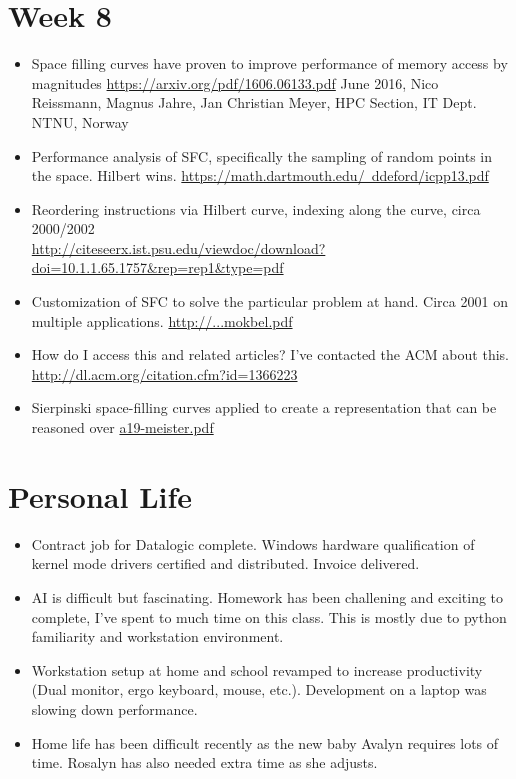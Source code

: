 \documentclass[12pt]{article}
\begin{document}
\section{Week 8}
\begin{itemize}
	\item Space filling curves have proven to improve performance of memory access by magnitudes \href{https://arxiv.org/pdf/1606.06133.pdf}{https://arxiv.org/pdf/1606.06133.pdf} June 2016, Nico Reissmann, Magnus Jahre, Jan Christian Meyer, HPC Section, IT Dept. NTNU, Norway
	\item Performance analysis of SFC, specifically the sampling of random points in the space. Hilbert wins. \href{https://math.dartmouth.edu/~ddeford/icpp13.pdf}{https://math.dartmouth.edu/~ddeford/icpp13.pdf}
	\item Reordering instructions via Hilbert curve, indexing along the curve, circa 2000/2002\\ \href{http://citeseerx.ist.psu.edu/viewdoc/download?doi=10.1.1.65.1757&rep=rep1&type=pdf}{http://citeseerx.ist.psu.edu/viewdoc/download?doi=10.1.1.65.1757\&rep=rep1\&type=pdf}
	
	\item Customization of SFC to solve the particular problem at hand. Circa 2001 on multiple applications. \href{https://www.cerias.purdue.edu/assets/pdf/bibtex_archive/p512-mokbel.pdf}{http://...mokbel.pdf}
	\item How do I access this and related articles? I've contacted the ACM about this. 
	\href{http://dl.acm.org/citation.cfm?id=1366223}{http://dl.acm.org/citation.cfm?id=1366223}
	\item Sierpinski space-filling curves applied to create a representation that can be reasoned over \href{http://delivery.acm.org/10.1145/2950000/2947668/a19-meister.pdf?ip=71.210.18.67\&id=2947668\&acc=OPEN\&key=4D4702B0C3E38B35%2E4D4702B0C3E38B35%2E097C819FD0D4FEF9%2E6D218144511F3437&CFID=694001933&CFTOKEN=39857927&__acm__=1479277565_87c43d68c57fdd45bfa83ddcef0eed42}{a19-meister.pdf}
\end{itemize}

\section{Personal Life}
\begin{itemize}
	\item Contract job for Datalogic complete. Windows hardware qualification of kernel mode drivers certified and distributed. Invoice delivered. 
	\item AI is difficult but fascinating. Homework has been challening and exciting to complete, I've spent to much time on this class. This is mostly due to python familiarity and workstation environment. 
	\item Workstation setup at home and school revamped to increase productivity (Dual monitor, ergo keyboard, mouse, etc.). Development on a laptop was slowing down performance.
	\item Home life has been difficult recently as the new baby Avalyn requires lots of time. Rosalyn has also needed extra time as she adjusts. 
\end{itemize}
\end{document}

